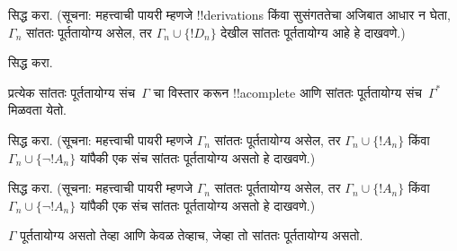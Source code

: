 \documentclass[../../../include/open-logic-section]{subfiles}
\begin{document}
\begin{prob}
 सिद्ध करा. (सूचना: महत्त्वाची
पायरी म्हणजे !!{derivation}s किंवा सुसंगततेचा अजिबात आधार न घेता,
$\Gamma_n$ सांततः पूर्ततायोग्य असेल, तर $\Gamma_n \cup \{!D_n\}$
देखील सांततः पूर्ततायोग्य आहे हे दाखवणे.)
\end{prob}
\tagendprob


\begin{prob}
 सिद्ध करा.
\end{prob}
\tagendprob

\begin{lem}
 प्रत्येक सांततः पूर्ततायोग्य संच~$\Gamma$
चा विस्तार करून !!a{complete} आणि सांततः पूर्ततायोग्य संच~$\Gamma^*$
मिळवता येतो.
\end{lem}

\begin{prob}
 सिद्ध करा. (सूचना: महत्त्वाची
पायरी म्हणजे $\Gamma_n$ सांततः पूर्ततायोग्य असेल, तर $\Gamma_n \cup
\{!A_n\}$ किंवा $\Gamma_n \cup \{\lnot !A_n\}$ यांपैकी एक संच सांततः
पूर्ततायोग्य असतो हे दाखवणे.)
\end{prob}
\tagendprob

\begin{prob}
 सिद्ध करा. (सूचना: महत्त्वाची
पायरी म्हणजे $\Gamma_n$ सांततः पूर्ततायोग्य असेल, तर $\Gamma_n \cup
\{!A_n\}$ किंवा $\Gamma_n \cup \{\lnot !A_n\}$ यांपैकी एक संच सांततः
पूर्ततायोग्य असतो हे दाखवणे.)
\end{prob}
\tagendprob

\begin{thm}[संहतता]
 $\Gamma$ पूर्ततायोग्य असतो तेव्हा आणि
केवळ तेव्हाच, जेव्हा तो सांततः पूर्ततायोग्य असतो.
\end{thm}
\end{document}
